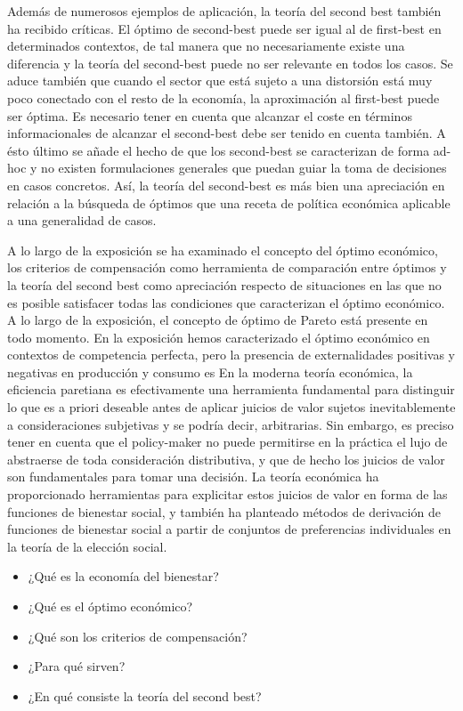 \documentclass{nuevotema}
\begin{document}
Además de numerosos ejemplos de aplicación, la teoría del second best también ha recibido críticas. El óptimo de second-best puede ser igual al de first-best en determinados contextos, de tal manera que no necesariamente existe una diferencia y la teoría del second-best puede no ser relevante en todos los casos. Se aduce también que cuando el sector que está sujeto a una distorsión está muy poco conectado con el resto de la economía, la aproximación al first-best puede ser óptima. Es necesario tener en cuenta que alcanzar el coste en términos informacionales de alcanzar el second-best debe ser tenido en cuenta también. A ésto último se añade el hecho de que los second-best se caracterizan de forma ad-hoc y no existen formulaciones generales que puedan guiar la toma de decisiones en casos concretos. Así, la teoría del second-best es más bien una apreciación en relación a la búsqueda de óptimos que una receta de política económica aplicable a una generalidad de casos.

A lo largo de la exposición se ha examinado el concepto del óptimo económico, los criterios de compensación como herramienta de comparación entre óptimos y la teoría del second best como apreciación respecto de situaciones en las que no es posible satisfacer todas las condiciones que caracterizan el óptimo económico. A lo largo de la exposición, el concepto de óptimo de Pareto está presente en todo momento. En la exposición hemos caracterizado el óptimo económico en contextos de competencia perfecta, pero la presencia de externalidades positivas y negativas en producción y consumo es En la moderna teoría económica, la eficiencia paretiana es efectivamente una herramienta fundamental para distinguir lo que es a priori deseable antes de aplicar juicios de valor sujetos inevitablemente a consideraciones subjetivas y se podría decir, arbitrarias. Sin embargo, es preciso tener en cuenta que el policy-maker no puede permitirse en la práctica el lujo de abstraerse de toda consideración distributiva, y que de hecho los juicios de valor son fundamentales para tomar una decisión. La teoría económica ha proporcionado herramientas para explicitar estos juicios de valor en forma de las funciones de bienestar social, y también ha planteado métodos de derivación de funciones de bienestar social a partir de conjuntos de preferencias individuales en la teoría de la elección social. 



\begin{itemize}
	\item ¿Qué es la economía del bienestar?
	\item ¿Qué es el óptimo económico?
	\item ¿Qué son los criterios de compensación?
	\item ¿Para qué sirven?
	\item ¿En qué consiste la teoría del second best?
\end{itemize}
\end{document}
